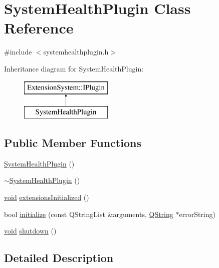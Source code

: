 \hypertarget{class_system_health_plugin}{\section{\-System\-Health\-Plugin \-Class \-Reference}
\label{class_system_health_plugin}
}


{\ttfamily \#include $<$systemhealthplugin.\-h$>$}

\-Inheritance diagram for \-System\-Health\-Plugin\-:\begin{figure}[H]
\begin{center}
\leavevmode
\includegraphics[height=2.000000cm]{class_system_health_plugin}
\end{center}
\end{figure}
\subsection*{\-Public \-Member \-Functions}
\begin{DoxyCompactItemize}
\item 
\hyperlink{group___system_health_plugin_gaccd196e55a7a3a7b48fcc59ee62a5a8b}{\-System\-Health\-Plugin} ()
\item 
\hyperlink{group___system_health_plugin_ga8c480b9596c0968c7bece8bb13874fd5}{$\sim$\-System\-Health\-Plugin} ()
\item 
\hyperlink{group___u_a_v_objects_plugin_ga444cf2ff3f0ecbe028adce838d373f5c}{void} \hyperlink{group___system_health_plugin_gac8ab8add53079a86d3ab978ac8c41438}{extensions\-Initialized} ()
\item 
bool \hyperlink{group___system_health_plugin_ga0b4b0272fcc0fd567c889344ee5f68d5}{initialize} (const \-Q\-String\-List \&arguments, \hyperlink{group___u_a_v_objects_plugin_gab9d252f49c333c94a72f97ce3105a32d}{\-Q\-String} $\ast$error\-String)
\item 
\hyperlink{group___u_a_v_objects_plugin_ga444cf2ff3f0ecbe028adce838d373f5c}{void} \hyperlink{group___system_health_plugin_gacf43a9878cbe82c0cf68216d045bc158}{shutdown} ()
\end{DoxyCompactItemize}


\subsection{\-Detailed \-Description}


